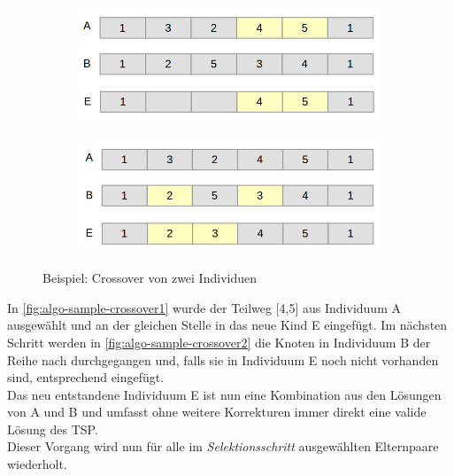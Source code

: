 \documentclass[12pt,a4paper]{scrreprt}
\begin{document}
\begin{figure}[ht]
	\centering
	\begin{subfigure}[t]{400pt}
    	\includegraphics[width=400pt]{images/algo_04_crossover_1.png}
        \caption{}
        \label{fig:algo-sample-crossover1}
    \end{subfigure}

    \begin{subfigure}[t]{400pt}
    	\includegraphics[width=400pt]{images/algo_04_crossover_2.png}
        \caption{}
        \label{fig:algo-sample-crossover2}
    \end{subfigure}

	\caption{Beispiel: Crossover von zwei Individuen}
	\label{fig:algo-sample-crossover}
\end{figure}

In \autoref{fig:algo-sample-crossover1} wurde der Teilweg [4,5] aus Individuum A ausgewählt und an der gleichen Stelle in das neue Kind E eingefügt. Im nächsten Schritt werden in \autoref{fig:algo-sample-crossover2} die Knoten in Individuum B der Reihe nach durchgegangen und, falls sie in Individuum E noch nicht vorhanden sind, entsprechend eingefügt.\\
Das neu entstandene Individuum E ist nun eine Kombination aus den Lösungen von A und B und umfasst ohne weitere Korrekturen immer direkt eine valide Lösung des TSP.\\
Dieser Vorgang wird nun für alle im \textit{Selektionsschritt} ausgewählten Elternpaare wiederholt.
\end{document}
